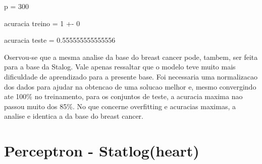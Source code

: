 \documentclass{article}
\begin{document}
p = 300 


\begin{Schunk}
\begin{Soutput}
acuracia treino = 1 +- 0
\end{Soutput}
\begin{Soutput}
acuracia teste = 0.555555555555556
\end{Soutput}
\end{Schunk}

Oservou-se que a mesma analise da base do breast cancer pode, tambem, ser feita para a base da Stalog. Vale apenas ressaltar que o modelo teve muito mais dificuldade de aprendizado para a presente base. Foi necessaria uma normalizacao dos dados para ajudar na obtencao de uma solucao melhor e, mesmo convergindo ate 100\% no treinamento, para os conjuntos de teste, a acuracia maxima nao passou muito dos 85\%. No que concerne overfitting e acuracias maximas, a analise e identica a da base do breast cancer.

\section{Perceptron - Statlog(heart)}
\end{document}
